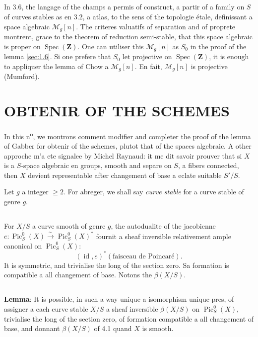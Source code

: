 \documentclass[12pt,a4paper]{article}
\theoremstyle{plain}
\theoremstyle{definition}
\theoremstyle{remark}
\DeclareMathOperator{\Pic}{Pic}
\DeclareMathOperator{\Spec}{Spec}
\DeclareMathOperator{\id}{id}
\begin{document}
\subsection{} In 3.6, the langage of the champs a permis of construct, a partir of a family on $S$ of curves stables as en 3.2, a atlas, to the sens of the topologie étale, definissant a space algebraic $\mathcal{M}_g[n]$. The criteres valuatifs of separation and of proprete montrent, grace to the theorem of reduction semi-stable, that this space algebraic is proper on $\Spec(\mathbf{Z})$. One can utiliser this $\mathcal{M}_g[n]$ as $S_0$ in the proof of the lemma \ref{sec:1.6}. Si one prefere that $S_0$ let projective on $\Spec(\mathbf{Z})$, it is enough to appliquer the lemma of Chow a $\mathcal{M}_g[n]$. En fait, $\mathcal{M}_g[n]$ is projective (Mumford).


\section{OBTENIR OF THE SCHEMES}

In this n\textsuperscript{o}, we montrons comment modifier and completer the proof of the lemma of Gabber for obtenir of the schemes, plutot that of the spaces algebraic. A other approche m'a ete signalee by Michel Raynaud: it me dit savoir prouver that si $X$ is a $S$-space algebraic en groups, smooth and separe on $S$, a fibers connected, then $X$ devient representable after changement of base a eclate suitable $S'/S$.

Let $g$ a integer $\geq 2$. For abreger, we shall say \emph{curve stable} for a curve stable of genre $g$.

\subsection{} For $X/S$ a curve smooth of genre $g$, the autodualite of the jacobienne $e : \Pic_S^0(X) \xrightarrow{\sim} \Pic_S^0(X)^*$ fournit a sheaf inversible relativement ample canonical on $\Pic_S^0(X)$:
\[
(\id,e)^*(\text{faisceau de Poincaré}).
\]
It is symmetric, and trivialise the long of the section zero. Sa formation is compatible a all changement of base. Notons the $\beta(X/S)$.

\subsection{}\label{sec:4.2}

\textbf{Lemma}: It is possible, in such a way unique a isomorphism unique pres, of assigner a each curve stable $X/S$ a sheaf inversible $\beta(X/S)$ on $\Pic_S^0(X)$, trivialise the long of the section zero, of formation compatible a all changement of base, and donnant $\beta(X/S)$ of 4.1 quand $X$ is smooth.
\end{document}
